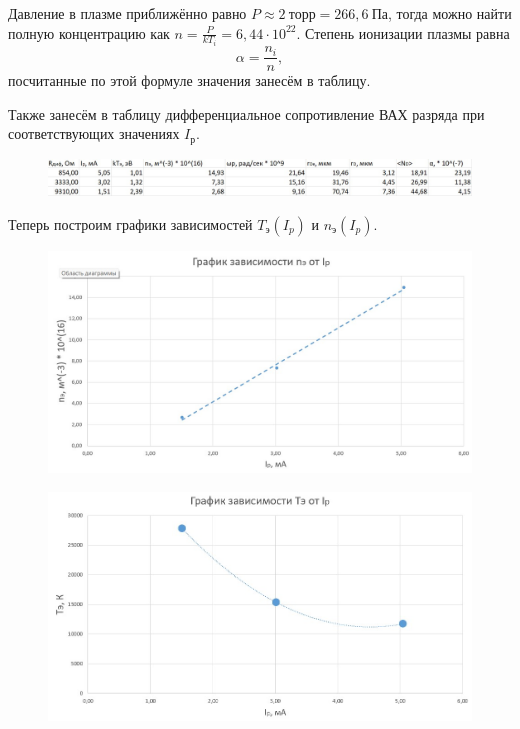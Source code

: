 \documentclass[a4paper,12pt]{article}
\begin{document}
Давление в плазме приближённо равно $P\approx2~\text{торр}=266,6~\text{Па}$, тогда можно найти полную концентрацию как $n=\frac{P}{kT_i}=6,44\cdot10^{22}$. Степень ионизации плазмы равна\[\alpha=\frac{n_i}{n},\]посчитанные по этой формуле значения занесём в таблицу.

Также занесём в таблицу дифференциальное сопротивление ВАХ разряда при соответствующих значениях $I_{\text{р}}$.

\begin{figure}[H]
	\begin{center}
    		\includegraphics[width =1\textwidth]{tabliza4.jpg}
    	\end{center}
\end{figure} 

Теперь построим графики зависимостей $T_\text{э}(I_p)$ и $n_\text{э}(I_p)$.

\begin{figure}[H]
	\begin{center}
    		\includegraphics[width =1\textwidth]{graphik6.jpg}
    	\end{center}
\end{figure} 

\begin{figure}[H]
	\begin{center}
    		\includegraphics[width =1\textwidth]{graphik7.jpg}
    	\end{center}
\end{figure} 
\end{document}
